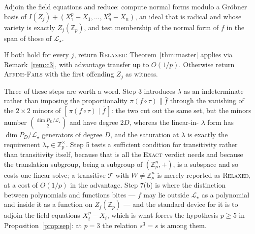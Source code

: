 \documentclass{conjura-solution}
\newcommand{\Zp}{\mathbb{Z}_p}
\newcommand{\Zpx}{\mathbb{Z}_p^{\times}}
\newcommand{\LL}{\mathcal{L}}
\begin{document}
\begin{procedurebox}
\begin{enumerate}[label=\textup{\arabic*.},leftmargin=2.2em,itemsep=3pt]
\begin{enumerate}[label=\textup{(\alph*)},leftmargin=2.2em,topsep=2pt,itemsep=1pt]
                Adjoin the field equations and reduce: compute normal forms modulo a Gr\"obner
                basis of $I(Z_j)+(X_1^{p}-X_1,\dots,X_n^{p}-X_n)$, an ideal that is radical and
                whose variety is exactly $Z_j(\Zp)$, and test membership of the normal form of
                $f$ in the span of those of $\LL_\star$.
        \end{enumerate}
        If both hold for every $j$, return \textsc{Relaxed}: Theorem~\ref{thm:master} applies
        via Remark~\ref{rem:c3}, with advantage transfer up to $O(1/p)$. Otherwise return
        \textsc{Affine-Fails} with the first offending $Z_j$ as witness.
\end{enumerate}
\end{procedurebox}

Three of these steps are worth a word. Step 3 introduces $\lambda$ as an indeterminate rather
than imposing the proportionality $\pi(f\circ\tau)\parallel\bar f$ through the vanishing of the
$2\times 2$ minors of $[\,\pi(f\circ\tau)\mid\bar f\,]$: the two cut out the same set, but the
minors number $\binom{\dim P_D/\LL_\star}{2}$ and have degree $2D$, whereas the linear-in-%
$\lambda$ form has $\dim P_D/\LL_\star$ generators of degree $D$, and the saturation at
$\lambda$ is exactly the requirement $\lambda_\tau\in\Zpx$. Step 5 tests a sufficient condition
for transitivity rather than transitivity itself, because that is all the \textsc{Exact} verdict
needs and because the translation subgroup, being a subgroup of $(\Zp^{n},+)$, is a subspace and
so costs one linear solve; a transitive $\mathcal T$ with $W\neq\Zp^{n}$ is merely reported as
\textsc{Relaxed}, at a cost of $O(1/p)$ in the advantage. Step 7(b) is where the distinction
between polynomials and functions bites --- $f$ may lie outside $\LL_\star$ as a polynomial and
inside it as a function on $Z_j(\Zp)$ --- and the standard device for it is to adjoin the field
equations $X_i^{p}-X_i$, which is what forces the hypothesis $p\ge 5$ in
Proposition~\ref{prop:sep}: at $p=3$ the relation $s^{3}=s$ is among them.
\end{document}
